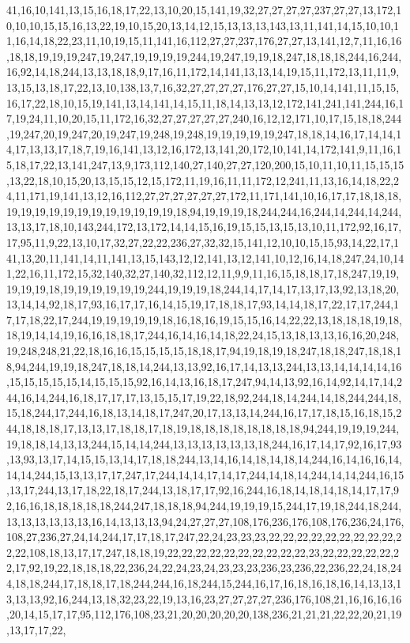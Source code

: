 41,16,10,141,13,15,16,18,17,22,13,10,20,15,141,19,32,27,27,27,27,237,27,27,13,172,10,10,10,15,15,16,13,22,19,10,15,20,13,14,12,15,13,13,13,143,13,11,141,14,15,10,10,11,16,14,18,22,23,11,10,19,15,11,141,16,112,27,27,237,176,27,27,13,141,12,7,11,16,16,18,18,19,19,19,247,19,247,19,19,19,19,244,19,247,19,19,18,247,18,18,18,244,16,244,16,92,14,18,244,13,13,18,18,9,17,16,11,172,14,141,13,13,14,19,15,11,172,13,11,11,9,13,15,13,18,17,22,13,10,138,13,7,16,32,27,27,27,27,176,27,27,15,10,14,141,11,15,15,16,17,22,18,10,15,19,141,13,14,141,14,15,11,18,14,13,13,12,172,141,241,141,244,16,17,19,24,11,10,20,15,11,172,16,32,27,27,27,27,27,240,16,12,12,171,10,17,15,18,18,244,19,247,20,19,247,20,19,247,19,248,19,248,19,19,19,19,19,247,18,18,14,16,17,14,14,14,17,13,13,17,18,7,19,16,141,13,12,16,172,13,141,20,172,10,141,14,172,141,9,11,16,15,18,17,22,13,141,247,13,9,173,112,140,27,140,27,27,120,200,15,10,11,10,11,15,15,15,13,22,18,10,15,20,13,15,15,12,15,172,11,19,16,11,11,172,12,241,11,13,16,14,18,22,24,11,171,19,141,13,12,16,112,27,27,27,27,27,27,172,11,171,141,10,16,17,17,18,18,18,19,19,19,19,19,19,19,19,19,19,19,19,18,94,19,19,19,18,244,244,16,244,14,244,14,244,13,13,17,18,10,143,244,172,13,172,14,14,15,16,19,15,15,13,15,13,10,11,172,92,16,17,17,95,11,9,22,13,10,17,32,27,22,22,236,27,32,32,15,141,12,10,10,15,15,93,14,22,17,141,13,20,11,141,14,11,141,13,15,143,12,12,141,13,12,141,10,12,16,14,18,247,24,10,141,22,16,11,172,15,32,140,32,27,140,32,112,12,11,9,9,11,16,15,18,18,17,18,247,19,19,19,19,19,18,19,19,19,19,19,19,244,19,19,19,18,244,14,17,14,17,13,17,13,92,13,18,20,13,14,14,92,18,17,93,16,17,17,16,14,15,19,17,18,18,17,93,14,14,18,17,22,17,17,244,17,17,18,22,17,244,19,19,19,19,19,18,16,18,16,19,15,15,16,14,22,22,13,18,18,18,19,18,18,19,14,14,19,16,16,18,18,17,244,16,14,16,14,18,22,24,15,13,18,13,13,16,16,20,248,19,248,248,21,22,18,16,16,15,15,15,15,18,18,17,94,19,18,19,18,247,18,18,247,18,18,18,94,244,19,19,18,247,18,18,14,244,13,13,92,16,17,14,13,13,244,13,13,14,14,14,14,16,15,15,15,15,15,14,15,15,15,92,16,14,13,16,18,17,247,94,14,13,92,16,14,92,14,17,14,244,16,14,244,16,18,17,17,17,13,15,15,17,19,22,18,92,244,18,14,244,14,18,244,244,18,15,18,244,17,244,16,18,13,14,18,17,247,20,17,13,13,14,244,16,17,17,18,15,16,18,15,244,18,18,18,17,13,13,17,18,18,17,18,19,18,18,18,18,18,18,18,18,94,244,19,19,19,244,19,18,18,14,13,13,244,15,14,14,244,13,13,13,13,13,13,18,244,16,17,14,17,92,16,17,93,13,93,13,17,14,15,15,13,14,17,18,18,244,13,14,16,14,18,14,18,14,244,16,14,16,16,14,14,14,244,15,13,13,17,17,247,17,244,14,14,17,14,17,244,14,18,14,244,14,14,244,16,15,13,17,244,13,17,18,22,18,17,244,13,18,17,17,92,16,244,16,18,14,18,14,18,14,17,17,92,16,16,18,18,18,18,18,244,247,18,18,18,94,244,19,19,19,15,244,17,19,18,244,18,244,13,13,13,13,13,13,16,14,13,13,13,94,24,27,27,27,108,176,236,176,108,176,236,24,176,108,27,236,27,24,14,244,17,17,18,17,247,22,24,23,23,23,22,22,22,22,22,22,22,22,22,22,22,108,18,13,17,17,247,18,18,19,22,22,22,22,22,22,22,22,22,22,23,22,22,22,22,22,22,17,92,19,22,18,18,18,22,236,24,22,24,23,24,23,23,23,236,23,236,22,236,22,24,18,244,18,18,244,17,18,18,17,18,244,244,16,18,244,15,244,16,17,16,18,16,18,16,14,13,13,13,13,13,92,16,244,13,18,32,23,22,19,13,16,23,27,27,27,27,236,176,108,21,16,16,16,16,20,14,15,17,17,95,112,176,108,23,21,20,20,20,20,20,138,236,21,21,21,22,22,20,21,19,13,17,17,22,